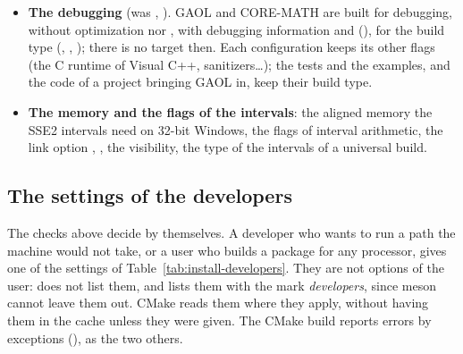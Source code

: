 \documentclass[12pt,a4paper,twoside,openright]{book}
\begin{document}
\begin{itemize}
  and to build the static library alone, as with Visual C++ (a DLL would
  export nothing).\newinvfive
\item[$\bullet$] \textbf{The debugging} (was ,
  ). GAOL and CORE-MATH are built for debugging,
  without optimization nor , with debugging information and
   (), for the
   build type (,
  , ); there is no target
   then. Each configuration keeps its other flags (the C runtime
  of Visual C++, sanitizers\ldots); the tests and the examples, and the code
  of a project bringing GAOL in, keep their build type.
\item[$\bullet$] \textbf{The memory and the flags of the intervals}: the
  aligned memory the SSE2 intervals need on 32-bit Windows, the flags of
  interval arithmetic, the link option ,
  , the visibility, the type of the intervals of a universal
  build.
\end{itemize}

\subsection{The settings of the developers}\label{sec:install-developers}

The checks above decide by themselves. A developer who wants to run a path
the machine would not take, or a user who builds a package for any processor,
gives one of the settings of Table~\ref{tab:install-developers}. They are not
options of the user:  does not list them, and
 lists them with the mark \emph{developers}, since meson
cannot leave them out. CMake reads them where they apply, without having them
in the cache unless they were given. The CMake build reports errors by
exceptions (), as the two others.
\end{document}
